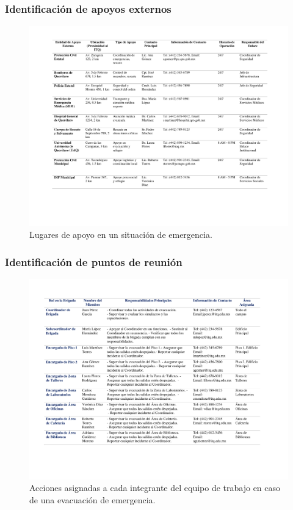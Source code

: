     \subsubsection{ Identificación de apoyos externos}
    \begin{figure}[H]
        \centering
        \includegraphics[trim = {20mm 10mm 10mm 16mm},clip,scale=0.30]{1/img/Apoyo.pdf}
        \caption{Lugares de apoyo en un situación de emergencia. }
        \label{fig:Apoyo}
    \end{figure}
    \subsubsection{Identificación de puntos de reunión}
    
    \begin{figure}[H]
        \centering
        \includegraphics[trim = {20mm 10mm 10mm 16mm},clip,scale=0.30]{1/img/Brigada.pdf}
        \caption{Acciones asignadas a cada integrante del equipo de trabajo en caso de una evacuación de emergencia. }
        \label{fig:Brigada}
    \end{figure}
